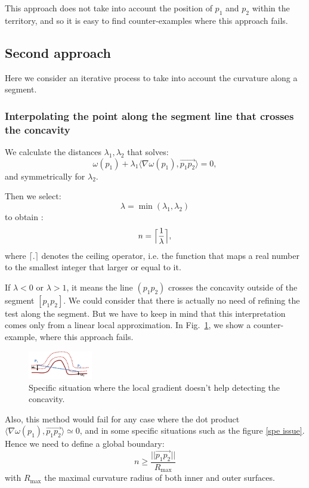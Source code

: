 \documentclass[11pt,a4paper]{article}
\newcommand{\scal}[2]{\ensuremath{\langle #1 , #2 \rangle}}
\begin{document}
This approach does not take into account the position of $p_1$ and $p_2$ within the territory, and so it is easy to find counter-examples where this approach fails.

\subsection{Second approach}

Here we consider an iterative process to take into account the curvature along a segment.

\subsubsection{Interpolating the point along the segment line that crosses the concavity} \label{subsec}
We calculate the distances $\lambda_1,\lambda_2$ that solves:
\begin{equation}
\omega (p_1) + \lambda_1 \scal{\nabla\omega(p_1)}{\overset{\rightarrow}{p_1p_2}} =  0,
\end{equation}
and symmetrically for $\lambda_2$.


Then we select:
\begin{equation}
\lambda = \min(\lambda_1, \lambda_2)
\end{equation}
to obtain :
\begin{equation}
n = \Bigl\lceil \frac{1}{\lambda} \Bigr\rceil,
\end{equation}
where $\lceil.\rceil$ denotes the ceiling operator, i.e. the function that maps a real number to the smallest integer that larger or equal to it.

If  $\lambda < 0$ or $\lambda > 1$, it means the line $(p_1p_2)$ crosses the concavity outside of the segment $[p_1p_2]$. We could consider that there is actually no need of refining the test along the segment. But we have to keep in mind that this interpretation comes only from a linear local approximation. In Fig.~\ref{fig:cec}, we show a counter-example, where this approach fails.

\begin{figure}[h!]
			\label{spe issue}
			\centering
			\includegraphics[width=0.25\textwidth]{Drawings/CurvatureTestExample1.png}
			\caption{Specific situation where the local gradient doesn't help detecting the concavity.\label{fig:cec}}
\end{figure}
Also, this method would fail for any case where the dot product $\scal{\nabla \omega(p_1)}{\overset{\rightarrow}{p_1p_2}} \simeq 0$, and in some specific situations such as the figure \ref{spe issue}. Hence we need to define a global boundary:
\begin{equation}
n \geq \frac{||\overset{\rightarrow}{p_1p_2}||}{R_{\text{max}}}
\end{equation}
with $R_{\text{max}}$ the maximal curvature radius of both inner and outer surfaces.
\end{document}
